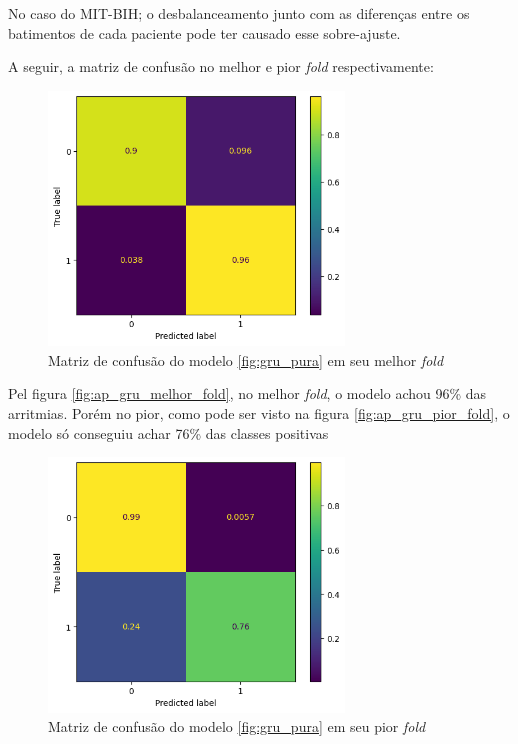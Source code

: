 \documentclass[
    12pt,                %
    openright,           %
    oneside,             %
    a4paper,             %
    brazil               %
]{abntex2}
\begin{document}
No caso do MIT-BIH; o desbalanceamento junto com as diferenças entre os batimentos de cada paciente pode ter causado esse sobre-ajuste.

A seguir, a matriz de confusão no melhor e pior \textit{fold} respectivamente:

\begin{figure}[H]
  \centering
   \includegraphics[width=0.7\textwidth]{figuras/modelos_resultados/matriz_confusao_melhor_fold_gru.png} %
  \caption{Matriz de confusão do modelo \ref{fig:gru_pura} em seu melhor \textit{fold}}
  \label{fig:matriz_confusao_melhor_fold_gru}
\end{figure}

Pel figura \ref{fig:ap_gru_melhor_fold}, no melhor \textit{fold}, o modelo achou 96\% das arritmias. Porém no pior, como pode ser visto
na figura \ref{fig:ap_gru_pior_fold}, o modelo só conseguiu achar 76\% das classes positivas

\begin{figure}[H]
  \centering
   \includegraphics[width=0.7\textwidth]{figuras/modelos_resultados/matriz_confusao_pior_fold_gru.png} %
  \caption{Matriz de confusão do modelo \ref{fig:gru_pura} em seu pior \textit{fold}}
  \label{fig:matriz_confusao_pior_fold_gru}
\end{figure}
\end{document}
